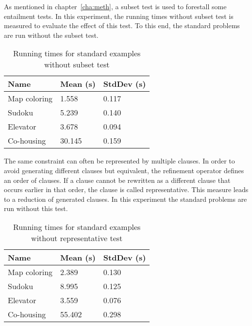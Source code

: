\begin{experiment}
	As mentioned in chapter~\ref{cha:meth}, a subset test is used to forestall some entailment tests.
	In this experiment, the running times without subset test is measured to evaluate the effect of this test.
	To this end, the standard problems are run without the subset test.

	\begin{table}[!htp]
		\begin{tabularx}{\textwidth}{XXX}
			\textbf{Name}	& \textbf{Mean (s)}	& \textbf{StdDev (s)} \\
			\toprule
			Map coloring 	& 1.558				& 0.117 \\
			Sudoku 			& 5.239				& 0.140 \\
			Elevator 		& 3.678 			& 0.094 \\
			Co-housing 		& 30.145			& 0.159
		\end{tabularx}
		\label{tbl:exp_speed_no_subset}
		\caption{Running times for standard examples without subset test}
	\end{table}
\end{experiment}

\begin{experiment}
	The same constraint can often be represented by multiple clauses.
	In order to avoid generating different clauses but equivalent, the refinement operator defines an order of clauses.
	If a clause cannot be rewritten as a different clause that occurs earlier in that order, the clause is called representative.
	This measure leads to a reduction of generated clauses.
	In this experiment the standard problems are run without this test.

	\begin{table}[!htp]
		\begin{tabularx}{\textwidth}{XXX}
			\textbf{Name}	& \textbf{Mean (s)}	& \textbf{StdDev (s)} \\
			\toprule
			Map coloring 	& 2.389				& 0.130 \\
			Sudoku 			& 8.995				& 0.125 \\
			Elevator 		& 3.559 			& 0.076 \\
			Co-housing 		& 55.402			& 0.298
		\end{tabularx}
		\label{tbl:exp_speed_no_representative}
		\caption{Running times for standard examples without representative test}
	\end{table}

\end{experiment}

